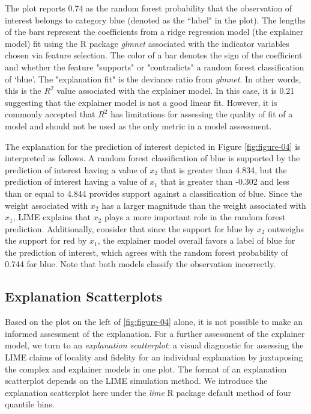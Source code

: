 \documentclass[AMS,STIX2COL]{WileyNJD-v2}\usepackage[]{graphicx}\usepackage[]{color}
\begin{document}
The plot reports 0.74 as  the random forest  probability  that the observation of interest belongs to category blue (denoted as the ``label" in the plot). The lengths of the bars represent the  coefficients from a ridge regression model (the explainer model) fit using the R package \emph{glmnet} \citep{simon:2011} associated with the indicator variables chosen via feature selection. The color of a  bar denotes the sign of the coefficient and whether the feature "supports" or "contradicts" a random forest classification of `blue'. The "explanation fit" is the deviance ratio from  \emph{glmnet}. In other words, this is the $R^2$ value associated with the explainer model. In this case, it is 0.21 suggesting that the explainer model is not a good linear fit. However, it is commonly accepted that $R^2$ has limitations for assessing the quality of fit of a model \citep{sapra:2014} and  should not be used as the only metric in a model assessment.

The explanation for the prediction of interest depicted in Figure \ref{fig:figure-04} is interpreted as follows. A random forest classification of blue is supported by the prediction of interest having a value of $x_2$ that is greater than 4.834, but the prediction of interest having a value of $x_1$ that is greater than -0.302 and less than or equal to 4.844 provides support against a classification of blue. Since the weight associated with $x_2$ has a larger magnitude than the weight associated with $x_1$, LIME explains that $x_2$ plays a more important role in the random forest prediction. Additionally, consider that since the support for blue by $x_2$ outweighs the support for red by $x_1$, the explainer model overall favors a label of blue for the prediction of interest, which agrees with the random forest probability of 0.744 for blue. Note that both models classify the observation incorrectly.

\subsection{Explanation Scatterplots} \label{exp-scatter}

Based on the plot on the left of \autoref{fig:figure-04} alone, it is not possible to make an informed assessment of the explanation. For a further assessment of the explainer model, we turn to an \emph{explanation scatterplot}: a visual diagnostic for assessing the LIME claims of locality and fidelity for an individual explanation by juxtaposing the complex and explainer models in one plot. The format of an explanation scatterplot depends on the LIME simulation method. We introduce the explanation scatterplot here under the \emph{lime} R package default method of four quantile bins.
\end{document}
